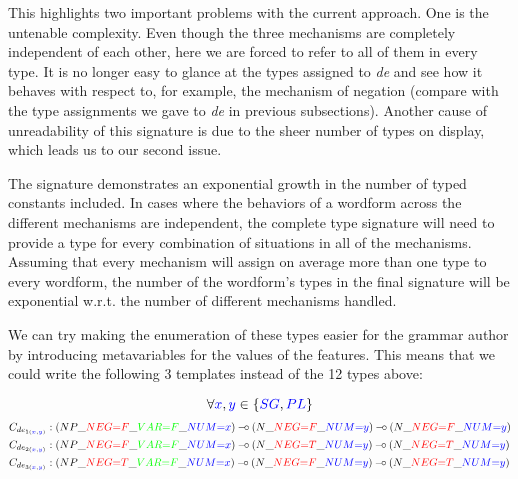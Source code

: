 This highlights two important problems with the current approach. One is
the untenable complexity. Even though the three mechanisms are
completely independent of each other, here we are forced to refer to all
of them in every type. It is no longer easy to glance at the types
assigned to \emph{de} and see how it behaves with respect to, for
example, the mechanism of negation (compare with the type assignments we
gave to \emph{de} in previous subsections). Another cause of
unreadability of this signature is due to the sheer number of types on
display, which leads us to our second issue.

The signature demonstrates an exponential growth in the number of typed
constants included. In cases where the behaviors of a wordform across
the different mechanisms are independent, the complete type signature
will need to provide a type for every combination of situations in all
of the mechanisms. Assuming that every mechanism will assign on average
more than one type to every wordform, the number of the wordform's types
in the final signature will be exponential w.r.t. the number of
different mechanisms handled.

We can try making the enumeration of these types easier for the grammar
author by introducing metavariables for the values of the features. This
means that we could write the following 3 templates instead of the 12
types above:

$$
\forall \textcolor{blue}{x}, \textcolor{blue}{y} \in \{\textcolor{blue}{SG}, \textcolor{blue}{PL}\}
$$
\begin{align*}
C_{de_{1(\textcolor{blue}{x}, \textcolor{blue}{y})}} &: (NP\_\textcolor{red}{NEG{=}F}\_\textcolor{green}{VAR{=}F}\_\textcolor{blue}{NUM{=}x}) \mathbin{{-}\mkern-3.5mu{\circ}} (N\_\textcolor{red}{NEG{=}F}\_\textcolor{blue}{NUM{=}y}) \mathbin{{-}\mkern-3.5mu{\circ}} (N\_\textcolor{red}{NEG{=}F}\_\textcolor{blue}{NUM{=}y}) \\
C_{de_{2(\textcolor{blue}{x}, \textcolor{blue}{y})}} &: (NP\_\textcolor{red}{NEG{=}F}\_\textcolor{green}{VAR{=}F}\_\textcolor{blue}{NUM{=}x}) \mathbin{{-}\mkern-3.5mu{\circ}} (N\_\textcolor{red}{NEG{=}T}\_\textcolor{blue}{NUM{=}y}) \mathbin{{-}\mkern-3.5mu{\circ}} (N\_\textcolor{red}{NEG{=}T}\_\textcolor{blue}{NUM{=}y}) \\
C_{de_{3(\textcolor{blue}{x}, \textcolor{blue}{y})}} &: (NP\_\textcolor{red}{NEG{=}T}\_\textcolor{green}{VAR{=}F}\_\textcolor{blue}{NUM{=}x}) \mathbin{{-}\mkern-3.5mu{\circ}} (N\_\textcolor{red}{NEG{=}F}\_\textcolor{blue}{NUM{=}y}) \mathbin{{-}\mkern-3.5mu{\circ}} (N\_\textcolor{red}{NEG{=}T}\_\textcolor{blue}{NUM{=}y})
\end{align*}

